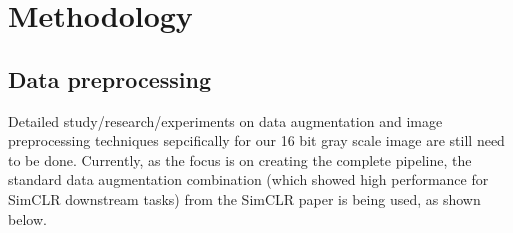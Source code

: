 \chapter{Methodology}\label{ch: Methodology}

\section{Data preprocessing} \label{sec:data preprocessing}

Detailed study/research/experiments on data augmentation and image preprocessing techniques sepcifically for our 16 bit gray scale image are still need to be done.
Currently, as the focus is on creating the complete pipeline, the standard data augmentation combination (which showed high performance for SimCLR downstream tasks) from the SimCLR \cite{chen2020simple} paper is being used, as shown below.

